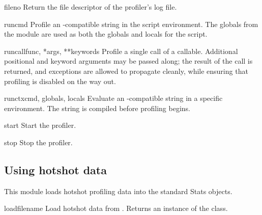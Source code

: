 \begin{methoddesc}{fileno}{}
Return the file descriptor of the profiler's log file.
\end{methoddesc}

\begin{methoddesc}{run}{cmd}
Profile an -compatible string in the script environment.
The globals from the  module are used as
both the globals and locals for the script.
\end{methoddesc}

\begin{methoddesc}{runcall}{func, *args, **keywords}
Profile a single call of a callable.
Additional positional and keyword arguments may be passed
along; the result of the call is returned, and exceptions are
allowed to propagate cleanly, while ensuring that profiling is
disabled on the way out.
\end{methoddesc}


\begin{methoddesc}{runctx}{cmd, globals, locals}
Evaluate an -compatible string in a specific environment.
The string is compiled before profiling begins.
\end{methoddesc}

\begin{methoddesc}{start}{}
Start the profiler.
\end{methoddesc}

\begin{methoddesc}{stop}{}
Stop the profiler.
\end{methoddesc}


\subsection{Using hotshot data}



This module loads hotshot profiling data into the standard 
Stats objects.

\begin{funcdesc}{load}{filename}
Load hotshot data from . Returns an instance
of the  class.
\end{funcdesc}

\begin{seealso}
\end{seealso}


